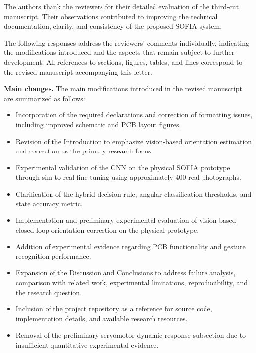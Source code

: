 \documentclass{LabDSTresponse}
\begin{document}
	
	
	The authors thank the reviewers for their
	detailed evaluation of the third-cut
	manuscript. Their observations contributed
	to improving the technical documentation,
	clarity, and consistency of the proposed
	SOFIA system.
	
	The following responses address the
	reviewers' comments individually, indicating
	the modifications introduced and the aspects
	that remain subject to further development.
	All references to sections, figures, tables,
	and lines correspond to the revised manuscript
	accompanying this letter.
	
	\textbf{Main changes.} The main modifications introduced
	in the revised manuscript are summarized as follows:
	
	\begin{itemize}
		\item Incorporation of the required declarations and
		correction of formatting issues, including improved
		schematic and PCB layout figures.
		
		\item Revision of the Introduction to emphasize
		vision-based orientation estimation and correction
		as the primary research focus.
		
		\item Experimental validation of the CNN on the
		physical SOFIA prototype through sim-to-real
		fine-tuning using approximately 400 real photographs.
		
		\item Clarification of the hybrid decision rule,
		angular classification thresholds, and state
		accuracy metric.
		
		\item Implementation and preliminary experimental
		evaluation of vision-based closed-loop orientation
		correction on the physical prototype.
		
		\item Addition of experimental evidence regarding
		PCB functionality and gesture recognition performance.
		
		\item Expansion of the Discussion and Conclusions
		to address failure analysis, comparison with related
		work, experimental limitations, reproducibility,
		and the research question.
		
		\item Inclusion of the project repository as a
		reference for source code, implementation details,
		and available research resources.
		
		\item Removal of the preliminary servomotor dynamic
		response subsection due to insufficient quantitative
		experimental evidence.
	\end{itemize}
	
\end{document}

